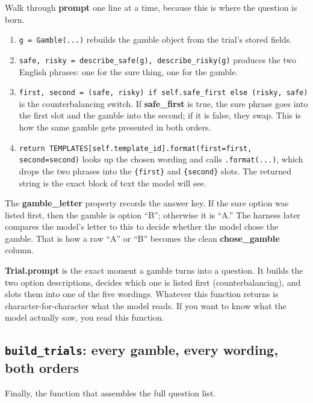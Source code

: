\documentclass[11pt]{article}
\newcommand{\file}[1]{\textbf{\ttfamily #1}}
\begin{document}
Walk through \file{prompt} one line at a time, because this is where the question is born.

\begin{enumerate}
\item \verb|g = Gamble(...)| rebuilds the gamble object from the trial's stored fields.
\item \verb|safe, risky = describe_safe(g), describe_risky(g)| produces the two English phrases: one
for the sure thing, one for the gamble.
\item \verb|first, second = (safe, risky) if self.safe_first else (risky, safe)| is the
counterbalancing switch. If \file{safe\_first} is true, the sure phrase goes into the first slot and
the gamble into the second; if it is false, they swap. This is how the same gamble gets presented in
both orders.
\item \verb|return TEMPLATES[self.template_id].format(first=first, second=second)| looks up the chosen
wording and calls \verb|.format(...)|, which drops the two phrases into the \verb|{first}| and
\verb|{second}| slots. The returned string is the exact block of text the model will see.
\end{enumerate}

The \file{gamble\_letter} property records the answer key. If the sure option was listed first, then
the gamble is option ``B''; otherwise it is ``A.'' The harness later compares the model's letter to
this to decide whether the model chose the gamble. That is how a raw ``A'' or ``B'' becomes the clean
\file{chose\_gamble} column.

\begin{plainbox}
\file{Trial.prompt} is the exact moment a gamble turns into a question. It builds the two option
descriptions, decides which one is listed first (counterbalancing), and slots them into one of the
five wordings. Whatever this function returns is character-for-character what the model reads. If you
want to know what the model actually saw, you read this function.
\end{plainbox}

\subsection{\texttt{build\_trials}: every gamble, every wording, both orders}

Finally, the function that assembles the full question list.
\end{document}
